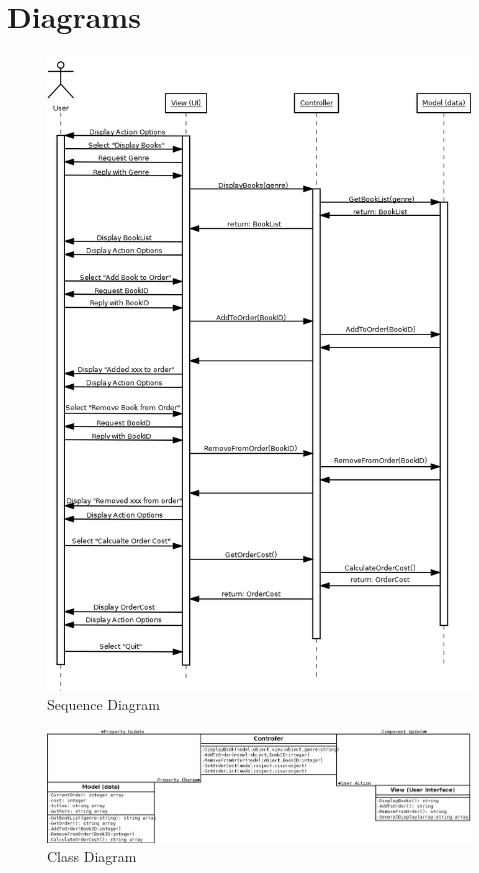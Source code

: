 \documentclass[12pt]{book}
\begin{document}
\section{Diagrams}
\begin{figure}
\caption{Sequence Diagram}
\includegraphics[height=\textheight]{dSequenceDiagram.png}
\end{figure}

\begin{landscape}
\begin{figure}
\caption{Class Diagram}
\includegraphics[width=1.3\textheight]{dClassDiagram.png}
\end{figure}
\end{landscape}
\end{document}
